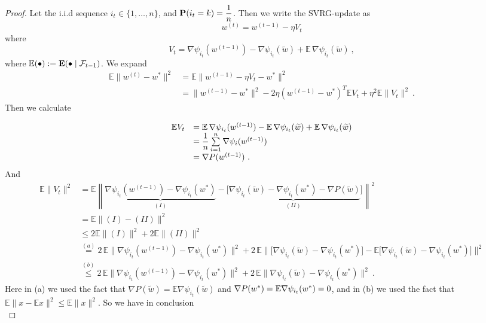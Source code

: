 \begin{proof}
Let the i.i.d sequence $
i_t\in \{1,\ldots,n\}$, and
$\mathbf P(i_t=k)=\dfrac{1}{n}$. Then we write the SVRG-update as 
$$w^{(t)} = w^{(t-1)}-\eta V_t$$
where
\[
V_t
=
\nabla \psi_{i_t}(w^{(t-1)})
-
\nabla \psi_{i_t}(\widetilde w)
+
\mathbb{E}\,\nabla \psi_{i_t}(\widetilde w) \ ,
\]
where
$\mathbb{E}(\bullet):=\mathbf E(\bullet\mid \mathcal{F}_{t-1})$. We expand
$$\begin{array}{ll}
\mathbb{E} \|w^{(t)}-w^*\|^2
& =
\mathbb{E} \|w^{(t-1)}-\eta V_t-w^*\|^2
\\
& =
\|w^{(t-1)}-w^*\|^2
-
2\eta (w^{(t-1)}-w^*)^{T}\mathbb{E}V_t
+
\eta^2 \mathbb{E}\|V_t\|^2 \ .
\end{array}
$$
Then we calculate

$$\begin{array}{ll}
\mathbb{E}V_t
& =
\mathbb{E}\,\nabla \psi_{i_t}(w^{(t-1)})
-
\mathbb{E}\,\nabla \psi_{i_t}(\widetilde w)
+
\mathbb{E}\,\nabla \psi_{i_t}(\widetilde w)
\\
& =
\dfrac{1}{n}\sum\limits_{i=1}^{n}\nabla \psi_i(w^{(t-1)})
\\
& =
\nabla P(w^{(t-1)}) \ .
\end{array}
$$
And
$$\begin{array}{ll}
\mathbb{E}\|V_t\|^2
& = \mathbb{E}\left\| \underbrace{\nabla {\psi_{i_t}(w^{(t-1)})-\nabla \psi_{i_t}(w^*)}}_{(I)}
-
\underbrace{\Big[
\nabla \psi_{i_t}(\widetilde w)-\nabla \psi_{i_t}(w^*)-\nabla P(\widetilde w)}_{(II)}
\Big]\right\|^2
\\
& = \mathbb{E}\|(I)-(II)\|^2
\\
& \leq 2\mathbb{E}\|(I)\|^2 + 2\mathbb{E}\|(II)\|^2
\\
& \stackrel{(a)}{=}
2\,\mathbb{E}\|\nabla \psi_{i_t}(w^{(t-1)})-\nabla \psi_{i_t}(w^*)\|^2
+ 2\,\mathbb{E}
\Big\|
\big[\nabla \psi_{i_t}(\widetilde w)-\nabla \psi_{i_t}(w^*)\big]
-
\mathbb{E}\big[\nabla \psi_{i_t}(\widetilde w)-\nabla \psi_{i_t}(w^*)\big]
\Big\|^2
\\
&\stackrel{(b)}{\leq}
2\,\mathbb{E}\|\nabla \psi_{i_t}(w^{(t-1)})-\nabla \psi_{i_t}(w^*)\|^2 +
2\,\mathbb{E}\|\nabla \psi_{i_t}(\widetilde w)-\nabla \psi_{i_t}(w^*)\|^2 \ .
\end{array}
$$
Here in (a) we used the fact that $\nabla P(\widetilde w)=\mathbb{E}{\nabla \psi_{i_t}(\widetilde w)}$ and $\nabla P(w^*)=\mathbb{E}\nabla \psi_{i_t}(w^*)=0$, and in (b) we used the fact that $
\mathbb{E}\|x-\mathbb{E}x\|^2\le \mathbb{E}\|x\|^2$. So we have in conclusion 
\begin{equation}\label{Thm:ConvexFunctionMainTheorem:Eq:IterationEstimate}

\end{equation}
\end{proof}
